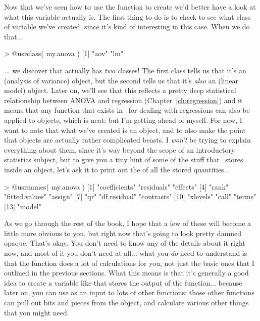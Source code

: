 
Now that we've seen how to use the  function to create  we'd better have a look at what this variable actually is. The first thing to do is to check to see what class of variable we've created, since it's  kind of interesting in this case. When we do that...
\begin{rblock1}
> @usr{class( my.anova )}
[1] "aov" "lm" 
\end{rblock1}
... we discover that  actually has {\it two} classes! The first class tells us that it's an  (analysis of variance) object, but the second tells us that it's {\it also} an  (linear model) object. Later on, we'll see that this reflects a pretty deep statistical relationship between ANOVA and regression (Chapter~\ref{ch:regression}) and it means that any function that exists in \R\ for dealing with regressions can also be applied to  objects, which is neat; but I'm getting ahead of myself. For now, I want to note that what we've created is an  object, and to also make the point that  objects are actually rather complicated beasts. I {\it won't} be trying to explain everything about them, since it's way beyond the scope of an introductory statistics subject, but to give you a tiny hint of some of the stuff that \R\ stores inside an  object, let's ask it to print out the  of all the stored quantities...
\begin{rblock1}
> @usr{names( my.anova )}
 [1] "coefficients"  "residuals"     "effects"      
 [4] "rank"          "fitted.values" "assign"       
 [7] "qr"            "df.residual"   "contrasts"    
[10] "xlevels"       "call"          "terms"        
[13] "model"    
\end{rblock1}
As we go through the rest of the book, I hope that a few of these will become a little more obvious to you, but right now that's going to look pretty damned opaque. That's okay. You don't need to know any of the details about it right now, and most of it you don't need at all... what you {\it do} need to understand is that the  function does a lot of calculations for you, not just the basic ones that I outlined in the previous sections. What this means is that it's generally a good idea to create a variable like  that stores the output of the  function... because later on, you can use  as an input to lots of other functions:  those other functions can pull out bits and pieces from the  object, and calculate various other things that you might need.

